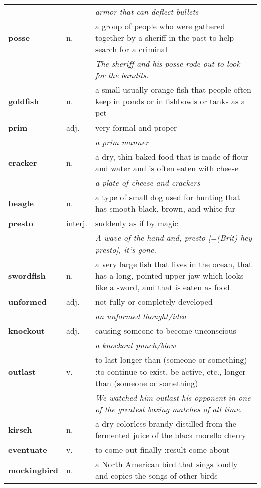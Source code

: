 \documentclass[a4paper]{article}
\begin{document}
\begin{longtable}{llp{11cm}}
 & & \textit{armor that can deflect bullets}\\[0.08cm]
\textbf{posse} & n. &  a group of people who were gathered together by a sheriff in the past to help search for a criminal \\
 & & \textit{The sheriff and his posse rode out to look for the bandits.}\\[0.08cm]
\textbf{goldfish} & n. &  a small usually orange fish that people often keep in ponds or in fishbowls or tanks as a pet\\[0.08cm]
\textbf{prim} & adj. &  very formal and proper \\
 & & \textit{a prim manner}\\[0.08cm]
\textbf{cracker} & n. &  a dry, thin baked food that is made of flour and water and is often eaten with cheese \\
 & & \textit{a plate of cheese and crackers}\\[0.08cm]
\textbf{beagle} & n. &  a type of small dog used for hunting that has smooth black, brown, and white fur \\[0.08cm]
\textbf{presto} & interj. &  suddenly as if by magic \\
 & & \textit{A wave of the hand and, presto [=(Brit) hey presto], it's gone.}\\[0.08cm]
\textbf{swordfish} & n. &  a very large fish that lives in the ocean, that has a long, pointed upper jaw which looks like a sword, and that is eaten as food\\[0.08cm]
\textbf{unformed} & adj. &  not fully or completely developed \\
 & & \textit{an unformed thought/idea}\\[0.08cm]
\textbf{knockout} & adj. &  causing someone to become unconscious \\
 & & \textit{a knockout punch/blow}\\[0.08cm]
\textbf{outlast} & v. &  to last longer than (someone or something) :to continue to exist, be active, etc., longer than (someone or something) \\
 & & \textit{We watched him outlast his opponent in one of the greatest boxing matches of all time.}\\[0.08cm]
\textbf{kirsch} & n. &  a dry colorless brandy distilled from the fermented juice of the black morello cherry\\[0.08cm]
\textbf{eventuate} & v. &  to come out finally :result come about\\[0.08cm]
\textbf{mockingbird} & n. &  a North American bird that sings loudly and copies the songs of other birds \\[0.08cm]

\end{longtable}
\end{document}

